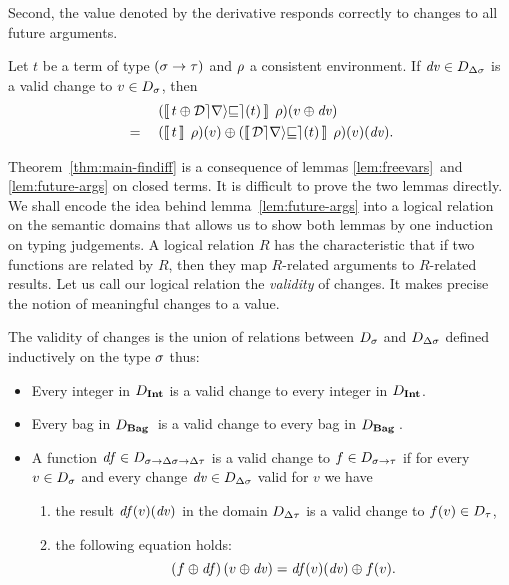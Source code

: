 \begin{oldSec}
Second, the value denoted by the
derivative responds correctly to changes to all future
arguments.

\begin{lemma}
\label{lem:future-args}
Let $t$ be a term of type $\Fun*\Gs\Gt$ and $\rho$ a consistent
environment. If $\mathit{dv}\in D_{\Delta\sigma}$ is a valid change to
$v\in D_{\sigma}$, then
\begin{alignat*}{2}
&&&
(\EvalWith{\Apply{\Derive t}t}{\Gr})(\Apply{\D v}{v})\\
&=\;&&
\Apply
{(\EvalWith{\Derive t}{\Gr})(v)(\D v)}
{(\EvalWith{t}{\Gr})(v)}.
\end{alignat*}
\end{lemma}

Theorem~\ref{thm:main-findiff} is a consequence of lemmas
\ref{lem:freevars}~and \ref{lem:future-args} on closed terms. It
is difficult to prove the two lemmas directly. We shall encode
the idea behind lemma~\ref{lem:future-args} into a logical
relation on the semantic domains that allows us to show both
lemmas by one induction on typing judgements. A logical relation
$R$ has the characteristic that if two functions are related by
$R$, then they map $R$-related arguments to $R$-related results.
Let us call our logical relation the \emph{validity} of changes.
It makes precise the notion of meaningful changes to a value.

\begin{definition}\label{def:valid}
The validity of changes is the union of relations between
$D_{\sigma}$ and $D_{\Delta\sigma}$ defined inductively on the type
$\sigma$ thus:
\begin{itemize}
\item Every integer in $\Dom{\Int}$ is a valid change to every
integer in $\Dom{\Int}$.
\item Every bag in $\Dom{\Bag}$ is a valid change to every bag in
$\Dom{\Bag}$.
\item
A function $\D f \in \Dom{\Fun\Gs{\Fun{\GD\Gs}{\GD\Gt}}}$ is a
valid change to $f \in \Dom{\Fun\Gs\Gt}$ if for every
$v\in D_{\sigma}$ and every change $\mathit{dv}\in D_{\Delta\sigma}$ valid for
$v$ we have
\begin{enumerate}[(1)]
\item the result $\mathit{df}(v)(\mathit{dv})$ in the domain $D_{\Delta\tau}$ is
a valid change to $f(v)\in D_{\tau}$,
\item the following equation holds:
\[
\Apply*{\D f}{f}(\Apply{\D v}{v}) = \Apply{f(v)}{\D f(v)(\D v)}.
\]
\end{enumerate}
\end{itemize}
\end{definition}


\end{oldSec}
